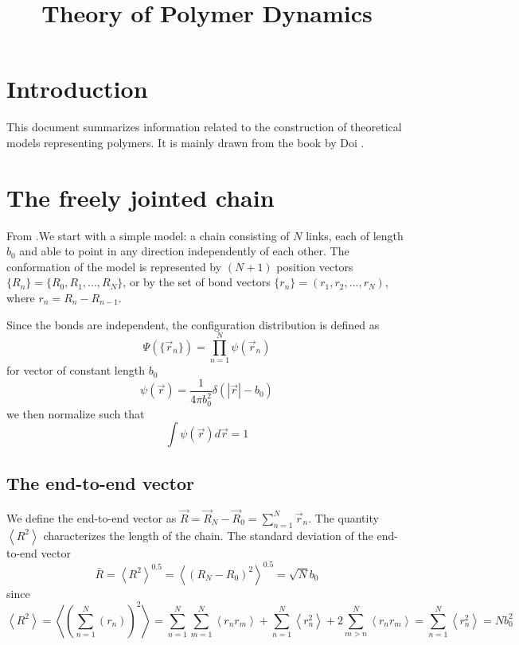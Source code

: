 \documentclass{paper}
\begin{document}
\title{Theory of Polymer Dynamics}
\maketitle
\section{Introduction}
This document summarizes information related to the construction of theoretical models representing polymers. 
It is mainly drawn from the book by Doi \cite{doi1986theory}. 
 
\section{The freely jointed chain}\label{section_theFreelyJointedChain}
From \cite{doi1986theory}.We start with a simple model: a chain consisting of $N$ links, each of length $b_0$ and able to point in any direction independently of each other. The conformation of the model is represented by $(N+1)$ position vectors $\{R_n\}=\{R_0,R_1,...,R_{N}\}$, or by the set of bond vectors $\{r_n\}=(r_1,r_2,...,r_N)$, where $r_n=R_{n}-R_{n-1}$. 

Since the bonds are independent, the configuration distribution is defined as 
\begin{equation*} 
\Psi(\{\vec{r}_n\})=\prod_{n=1}^N\psi(\vec{r}_n)
\end{equation*}
for vector of constant length $b_0$
\begin{equation*}
\psi(\vec{r})=\frac{1}{4\pi b_0^2}\delta(|\vec{r}|-b_0)
\end{equation*}
we then normalize such that 
\begin{equation*}
\int \psi(\vec{r})d\vec{r} =1
\end{equation*}


\subsection{The end-to-end vector}\label{subsection_theEndToEndVector}
We define the end-to-end vector as $\vec{R}=\vec{R}_N-\vec{R}_0=\sum_{n=1}^N \vec{r}_n$. The quantity $\left<R^2\right>$ characterizes the length of the chain. The standard deviation of the end-to-end vector
\begin{equation*}
\bar{R}=\left<R^2\right>^{0.5}=\left<(R_N-R_0)^2\right>^{0.5}=\sqrt{N}b_0
\end{equation*} 
since 
\begin{equation*}
\left<R^2\right> = \left<\left(\sum_{n=1}^N(r_n)\right)^2\right>=\sum_{n=1}^N\sum_{m=1}^N\left<r_nr_m\right>+\sum_{n=1}^N\left<r_n^2\right>+2\sum_{m>n}^N\left< r_nr_m\right>=\sum_{n=1}^N\left<r_n^2\right>=Nb_0^2
\end{equation*}
\end{document}
